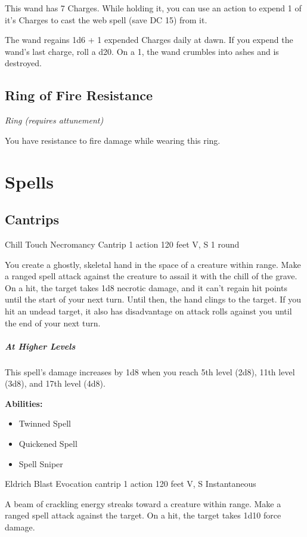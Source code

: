 \documentclass[a4paper,openany,twocolumn]{book}
\begin{document}
This wand has 7 Charges. While holding it, you can use an action to expend 1 of it's Charges to cast the web spell (save DC 15) from it.

The wand regains 1d6 + 1 expended Charges daily at dawn. If you expend the wand's last charge, roll a d20. On a 1, the wand crumbles into ashes and is destroyed.


\subsection*{Ring of Fire Resistance}
\textit{Ring (requires attunement)}

You have resistance to fire damage while wearing this ring.

\section*{Spells}
 
\subsection*{Cantrips}

\DndSpellHeader
  {Chill Touch}
  {Necromancy Cantrip}
  {1 action}
  {120 feet}
  {V, S}
  {1 round}

You create a ghostly, skeletal hand in the space of a creature within range. Make a ranged spell attack against the creature to assail it with the chill of the grave. On a hit, the target takes 1d8 necrotic damage, and it can't regain hit points until the start of your next turn. Until then, the hand clings to the target. If you hit an undead target, it also has disadvantage on attack rolls against you until the end of your next turn.
    
\subparagraph*{At Higher Levels} This spell's damage increases by 1d8 when you reach 5th level (2d8), 11th level (3d8), and 17th level (4d8).

\textbf{Abilities:}
\begin{itemize}
  \item Twinned Spell
  \item Quickened Spell
  \item Spell Sniper
\end{itemize}


\DndSpellHeader
  {Eldrich Blast}
  {Evocation cantrip}
  {1 action}
  {120 feet}
  {V, S}
  {Instantaneous}

A beam of crackling energy streaks toward a creature within range. Make a ranged spell attack against the target. On a hit, the target takes 1d10 force damage.
\end{document}
